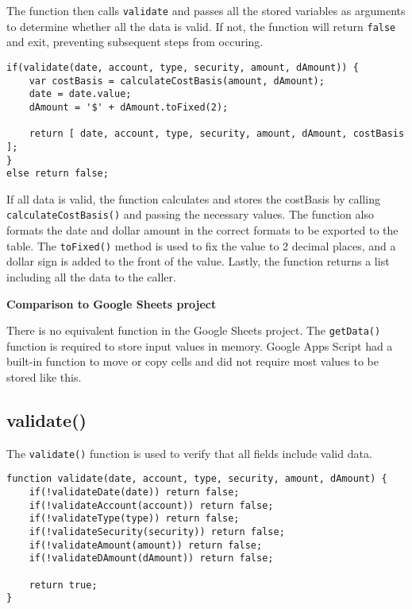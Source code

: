 \documentclass[letterpaper]{article}
\begin{document}
The function then calls \lstinline{validate} and passes all the stored variables as arguments to determine whether all the data is valid.
If not, the function will return \lstinline{false} and exit, preventing subsequent steps from occuring.

\begin{lstlisting}[firstnumber=16]
if(validate(date, account, type, security, amount, dAmount)) {
    var costBasis = calculateCostBasis(amount, dAmount);
    date = date.value;
    dAmount = '$' + dAmount.toFixed(2);

    return [ date, account, type, security, amount, dAmount, costBasis ];
}
else return false;
\end{lstlisting}

If all data is valid, the function calculates and stores the costBasis by calling \lstinline{calculateCostBasis()} and passing the necessary values.
The function also formats the date and dollar amount in the correct formats to be exported to the table.
The \lstinline{toFixed()} method is used to fix the value to 2 decimal places, and a dollar sign is added to the front of the value.
Lastly, the function returns a list including all the data to the caller.

\textbf{Comparison to Google Sheets project}

There is no equivalent function in the Google Sheets project.
The \lstinline{getData()} function is required to store input values in memory.
Google Apps Script had a built-in function to move or copy cells and did not require most values to be stored like this.

\subsection{validate()}

The \lstinline{validate()} function is used to verify that all fields include valid data.

\begin{lstlisting}[firstnumber=26]
function validate(date, account, type, security, amount, dAmount) {
    if(!validateDate(date)) return false;
    if(!validateAccount(account)) return false;
    if(!validateType(type)) return false;
    if(!validateSecurity(security)) return false;
    if(!validateAmount(amount)) return false;
    if(!validateDAmount(dAmount)) return false;

    return true;
}
\end{lstlisting}
\end{document}
